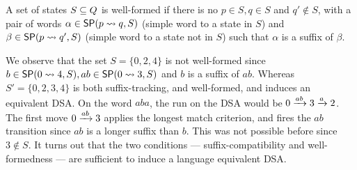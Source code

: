 \begin{definition}\label{def:well-formed-set}
  A set of states $S \subseteq Q$ is well-formed if there is no
  $p \in S, q \in S$ and $q' \notin S$, with a pair of words
  $\alpha \in \mathsf{SP}(p \rightsquigarrow q, S)$ (simple word to a state in $S$) and
  $\beta \in \mathsf{SP}(p \rightsquigarrow q', S)$ (simple word to a state not in $S$)
  such that $\alpha$ is a suffix of $\beta$.
\end{definition}

We observe that the set $S=\{0,2,4\}$ is not well-formed since
$b \in \mathsf{SP}(0 \rightsquigarrow 4, S), ab \in \mathsf{SP}(0 \rightsquigarrow 3, S)$ and $b$ is a suffix of
$ab$. Whereas $S'=\{0,2,3,4\}$ is both suffix-tracking, and
well-formed, and induces an equivalent DSA. On the word $aba$, the run
on the DSA would be $0 \xrightarrow{ab} 3 \xrightarrow{a} 2$. The first move
$0 \xrightarrow{ab} 3$ applies the longest match criterion, and fires the $ab$ transition
since $ab$ is a longer suffix than $b$.  This was not possible before
since $3 \notin S$. It turns out that the two conditions --- suffix-compatibility and
well-formedness --- are sufficient to induce a language equivalent
DSA.


